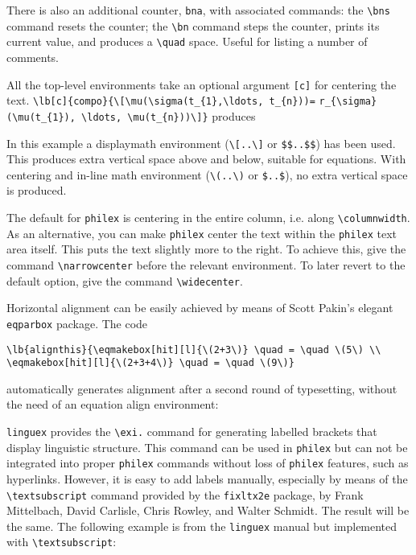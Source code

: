 \documentclass[10pt]{article}
\begin{document}

There  is also an additional counter, \verb+bna+, with associated commands: the \verb+\bns+ command resets the counter; the \verb+\bn+ command steps the counter, prints its current value, and produces a \verb+\quad+ space. Useful for listing a number of comments.

All the top-level  environments take an optional argument \verb+[c]+ for centering the text. \verb+\lb[c]{compo}{\[\mu(\sigma(t_{1},\ldots, t_{n}))=+ \verb+r_{\sigma}(\mu(t_{1}), \ldots, \mu(t_{n}))\]}+ produces

	In this example a displaymath environment (\verb+\[..\]+ or \verb+$$..$$+) has been used. This produces extra vertical space above and below, suitable for equations. With centering and in-line math environment (\verb+\(..\)+ or \verb+$..$+), no extra vertical space is produced.
	
	
The default for \verb+philex+ is centering in the entire column, i.e. along \verb+\columnwidth+. As an alternative, you can make \verb+philex+ center the text within the \verb+philex+ text area itself. This puts the text slightly more to the right. To achieve this, give the command \verb+\narrowcenter+ before the relevant environment. To later revert to the default option, give the command \verb+\widecenter+.

Horizontal alignment  can be easily achieved by means of Scott Pakin's elegant \verb+eqparbox+ package. The code

\begin{verbatim}
\lb{alignthis}{\eqmakebox[hit][l]{\(2+3\)} \quad = \quad \(5\) \\
\eqmakebox[hit][l]{\(2+3+4\)} \quad = \quad \(9\)}
\end{verbatim}
	automatically generates alignment after a second round of typesetting, without the need of an equation align environment:


\verb+linguex+ provides the \verb+\exi.+  command for generating labelled brackets that display linguistic structure. This command can be used in \verb+philex+ but can not be integrated into proper \verb+philex+ commands without loss of \verb+philex+ features, such as hyperlinks. However, it is easy to add labels manually, especially by means of the \verb+\textsubscript+ command provided by the \verb+fixltx2e+ package, by Frank Mittelbach, David Carlisle, Chris Rowley, and Walter Schmidt. The result will be the same. The following example is from the \verb+linguex+ manual but implemented with \verb+\textsubscript+:
\end{document}
